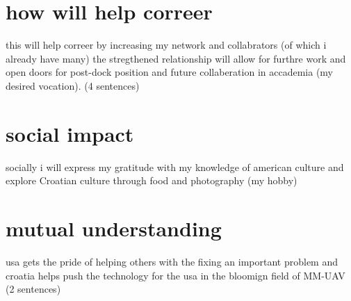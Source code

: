 \documentclass[12pt]{article}
\begin{document}
\section{how will help correer} 
this will help correer by increasing my network and collabrators (of which i already have many)  the 
stregthened relationship will allow for furthre work and open doors for post-dock position and future 
collaberation in accademia (my desired vocation).  (4 sentences)

\section{social impact}
socially i will express my gratitude with my knowledge of american culture and explore Croatian culture 
through food and photography (my hobby)

\section{mutual understanding}
usa gets the pride of helping others with the fixing an important problem and croatia helps push the 
technology for the usa in the bloomign field of MM-UAV (2 sentences)
\end{document}
